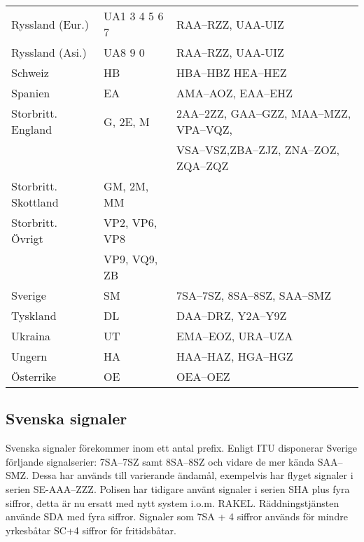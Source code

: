 \begin{center}
\begin{footnotesize}
\begin{longtable}{lll}
			Ryssland (Eur.)               & UA1 3 4 5 6 7  & RAA--RZZ, UAA-UIZ                                 \\
			Ryssland (Asi.)               & UA8 9 0        & RAA--RZZ, UAA-UIZ                                 \\
			Schweiz                       & HB             & HBA--HBZ HEA--HEZ                                 \\
			Spanien                       & EA             & AMA--AOZ, EAA--EHZ                                \\
			Storbritt. England            & G, 2E, M       & 2AA--2ZZ, GAA--GZZ, MAA--MZZ, VPA--VQZ,           \\
			                              &                & VSA--VSZ,ZBA--ZJZ, ZNA--ZOZ, ZQA--ZQZ             \\
			Storbritt. Skottland          & GM, 2M, MM     &                                                   \\
			Storbritt. Övrigt             & VP2, VP6, VP8  &                                                   \\
			                              & VP9, VQ9, ZB   &                                                   \\
			Sverige                       & SM             & 7SA--7SZ, 8SA--8SZ, SAA--SMZ                      \\
			Tyskland                      & DL             & DAA--DRZ, Y2A--Y9Z                                \\
			Ukraina                       & UT             & EMA--EOZ, URA--UZA                                \\
			Ungern                        & HA             & HAA--HAZ, HGA--HGZ                                \\
			Österrike                     & OE             & OEA--OEZ\\
		\end{longtable}
	\end{footnotesize}
\end{center}

\subsection{Svenska signaler}

Svenska signaler förekommer inom ett antal prefix. Enligt ITU disponerar Sverige
förljande signalserier: 7SA--7SZ samt 8SA--8SZ och vidare de mer kända SAA--SMZ.
Dessa har används till varierande ändamål, exempelvis har flyget signaler i
serien SE-AAA--ZZZ. Polisen har tidigare använt signaler i serien SHA plus fyra
siffror, detta är nu ersatt med nytt system i.o.m. RAKEL. Räddningstjänsten
använde SDA med fyra siffror. Signaler som 7SA + 4 siffror används för mindre
yrkesbåtar SC+4 siffror för fritidsbåtar.

